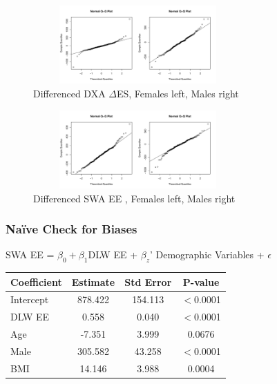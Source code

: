 \documentclass[handout]{beamer}\usepackage[]{graphicx}\usepackage[]{color}
\begin{document}
\begin{frame}

\begin{figure}
\centering
\includegraphics[width=8cm,height=3cm]{dxa_qq.pdf}
\caption{{Differenced DXA $\Delta$ES, Females left, Males right}}
\end{figure}

\begin{figure}
\centering
\includegraphics[width=8cm,height=3cm]{swa_qq.pdf}
\caption{Differenced SWA  EE , Females left, Males right}
\end{figure}


\end{frame}

\begin{frame}
\frametitle{Na{\"i}ve Check for Biases}

SWA EE = $\beta_0 + \beta_1$DLW EE + $\beta_z$' Demographic Variables + $\epsilon$ \\


\vspace{0.3cm}

\begin{table} \centering 
\begin{tabular}{l|ccc}
\hline
Coefficient & Estimate & Std Error & P-value \\
\hline
Intercept & 878.422 & 154.113 & $<$0.0001 \\
DLW EE & 0.558 & 0.040 & $<$0.0001 \\
Age & -7.351 & 3.999 & 0.0676 \\
Male & 305.582 & 43.258 & $<$0.0001 \\
BMI & 14.146 & 3.988 & 0.0004 \\
\hline
\end{tabular} 
\end{table} 
\end{frame}
\end{document}
